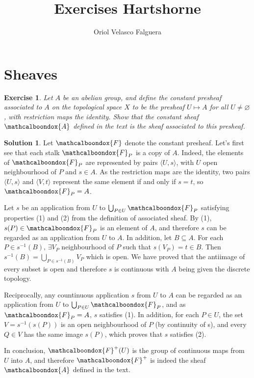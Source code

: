 \documentclass[12pt]{article}
\newtheorem{ex}{Exercise}[section]
\theoremstyle{definition}
\newtheorem*{sol}{Solution}
\newcommand{\sF}{\ensuremath{\mathcalboondox{F}}}
\newcommand{\sA}{\ensuremath{\mathcalboondox{A}}}
\begin{document}
\title{Exercises Hartshorne}
\author{Oriol Velasco Falguera}
\maketitle

\section{Sheaves}

\begin{ex}
	Let $A$ be an abelian group, and define the constant presheaf associated to $A$ on the topological space $X$ to be the presheaf $U \mapsto A$ for all $U \neq \varnothing$, with restriction maps the identity. Show that the constant sheaf $\sA$ defined in the text is the sheaf associated to this presheaf.
\end{ex}

\begin{sol}
	Let $\sF$ denote the constant presheaf. Let's first see that each stalk $\sF_P$ is a copy of $A$. Indeed, the elements of $\sF_P$ are represented by pairs $\langle U, s \rangle$, with $U$ open neighbourhood of $P$ and $s \in A$. As the restriction maps are the identity, two pairs $\langle U,s \rangle$ and $\langle V, t \rangle$ represent the same element if and only if $s = t$, so $\sF_P = A$.

	Let $s$ be an application from $U$ to $\bigcup_{P \in U} \sF_P$ satisfying properties (1) and (2) from the definition of associated sheaf. By (1), $s(P) \in \sF_P$ is an element of $A$, and therefore $s$ can be regarded as an application from $U$ to $A$. In addition, let $B \subseteq A$. For each $P \in s^{-1}(B), \, \exists V_{P}$ neighbourhood of $P$ such that $s(V_P) = t \in B$. Then $s^{-1}(B) = \bigcup_{P \in s^{-1}(B)} V_P$ which is open. We have proved that the antiimage of every subset is open and therefore $s$ is continuous with $A$ being given the discrete topology.

	Reciprocally, any countinuous application $s$ from $U$ to $A$ can be regarded as an application from $U$ to $\bigcup_{P \in U} \sF_P$, and as $\sF_P = A$, $s$ satisfies (1). In addition, for each $P \in U$, the set $V = s^{-1}(s(P))$ is an open neighbourhood of $P$ (by continuity of s), and every $Q \in V$ has the same image $s(P)$, which proves that $s$ satisfies (2).

	In conclusion, $\sF^{+}(U)$ is the group of continuous maps from $U$ into $A$, and therefore $\sF^{+}$ is indeed the sheaf $\sA$ defined in the text.
\end{sol}
\end{document}
